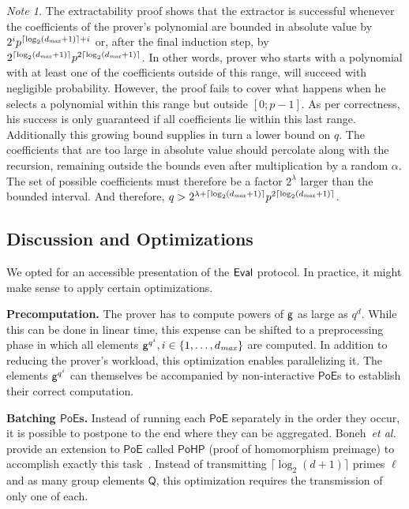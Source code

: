 \documentclass{article}
\theoremstyle{definition}
\begin{document}
{\it Note 1.} The extractability proof shows that the extractor is successful whenever the coefficients of the prover's polynomial are bounded in absolute value by $2^ip^{\lceil \log_2(d_{\it max} + 1) \rceil+i}$ or, after the final induction step, by $2^{\lceil \log_2(d_{\it max} + 1) \rceil}p^{2\lceil \log_2(d_{\it max} + 1) \rceil}$. In other words, prover who starts with a polynomial with at least one of the coefficients outside of this range, will succeed with negligible probability. However, the proof fails to cover what happens when he selects a polynomial within this range but outside $[0;p-1]$. As per correctness, his success is only guaranteed if all coefficients lie within this last range. Additionally this growing bound supplies in turn a lower bound on $q$. The coefficients that are too large in absolute value should percolate along with the recursion, remaining outside the bounds even after multiplication by a random $\alpha$. The set of possible coefficients must therefore be a factor $2^\lambda$ larger than the bounded interval. And therefore, $q > 2^{\lambda + \lceil \log_2(d_{\it max} + 1) \rceil}p^{2\lceil \log_2(d_{\it max} + 1) \rceil}$.

\subsection{Discussion and Optimizations}

We opted for an accessible presentation of the $\textsf{{Eval}}$ protocol. In practice, it might make sense to apply certain optimizations.

\textbf{Precomputation.} The prover has to compute powers of $\mathsf{g}$ as large as $q^d$. While this can be done in linear time, this expense can be shifted to a preprocessing phase in which all elements $\mathsf{g}^{q^i}, i \in \{1, \ldots, d_{\it max}\}$ are computed. In addition to reducing the prover's workload, this optimization enables parallelizing it. The elements $\mathsf{g}^{q^i}$ can themselves be accompanied by non-interactive $\mathsf{PoE}$s to establish their correct computation.

\textbf{Batching $\mathsf{PoE}$s.} Instead of running each $\mathsf{PoE}$ separately in the order they occur, it is possible to postpone to the end where they can be aggregated. Boneh~\emph{et al.} provide an extension to $\mathsf{PoE}$ called $\mathsf{PoHP}$ (proof of homomorphism preimage) to accomplish exactly this task~\cite[\S A.1]{C:BonBunFis19}. Instead of transmitting $\lceil \log_2(d + 1)\rceil $ primes $\ell$ and as many group elements $\mathsf{Q}$, this optimization requires the transmission of only one of each.
\end{document}
